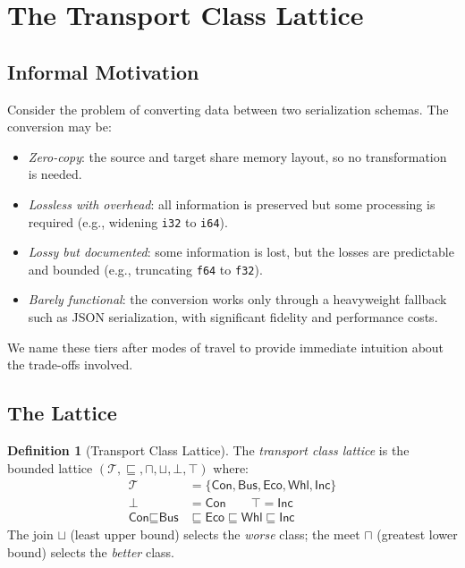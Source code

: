 \documentclass[11pt,a4paper]{article}
\theoremstyle{definition}
\newtheorem{definition}[theorem]{Definition}
\theoremstyle{remark}
\newcommand{\TC}{\mathcal{T}}                    %
\newcommand{\conc}{\textsf{Con}}                 %
\newcommand{\busi}{\textsf{Bus}}                 %
\newcommand{\econ}{\textsf{Eco}}                 %
\newcommand{\wheel}{\textsf{Whl}}               %
\newcommand{\incompat}{\textsf{Inc}}             %
\begin{document}
\section{The Transport Class Lattice}\label{sec:lattice}

\subsection{Informal Motivation}

Consider the problem of converting data between two serialization
schemas. The conversion may be:
\begin{itemize}[leftmargin=*]
  \item \emph{Zero-copy}: the source and target share memory layout, so
    no transformation is needed.
  \item \emph{Lossless with overhead}: all information is preserved but
    some processing is required (e.g., widening \texttt{i32} to
    \texttt{i64}).
  \item \emph{Lossy but documented}: some information is lost, but the
    losses are predictable and bounded (e.g., truncating
    \texttt{f64} to \texttt{f32}).
  \item \emph{Barely functional}: the conversion works only through a
    heavyweight fallback such as JSON serialization, with significant
    fidelity and performance costs.
\end{itemize}

We name these tiers after modes of travel to provide immediate
intuition about the trade-offs involved.

\subsection{The Lattice}

\begin{definition}[Transport Class Lattice]\label{def:tc-lattice}
The \emph{transport class lattice} is the bounded lattice
$(\TC, \sqsubseteq, \sqcap, \sqcup, \bot, \top)$ where:
\begin{align*}
  \TC &= \{\conc, \busi, \econ, \wheel, \incompat\} \\
  \bot &= \conc \qquad \top = \incompat \\
  \conc \sqsubseteq \busi &\sqsubseteq \econ \sqsubseteq \wheel
    \sqsubseteq \incompat
\end{align*}
The join $\sqcup$ (least upper bound) selects the \emph{worse} class;
the meet $\sqcap$ (greatest lower bound) selects the \emph{better}
class.
\end{definition}
\end{document}
